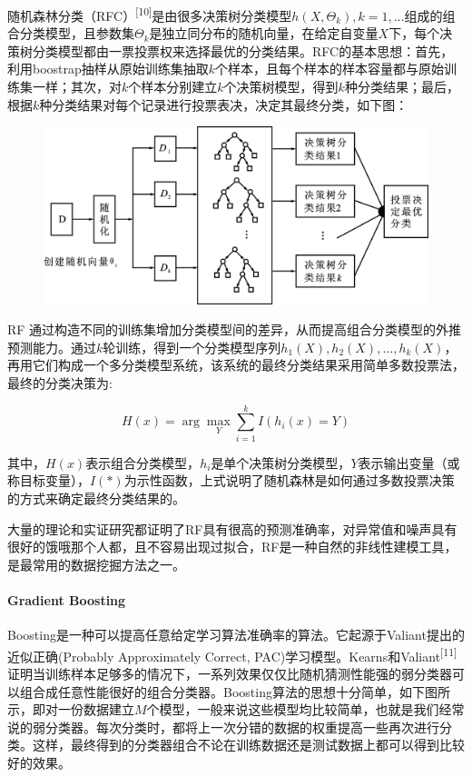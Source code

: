 随机森林分类（RFC）\textsuperscript{{[}10{]}}是由很多决策树分类模型\({h(X,\Theta_k),k=1,\ldots}\)组成的组合分类模型，且参数集\({\Theta_k}\)是独立同分布的随机向量，在给定自变量\(X\)下，每个决策树分类模型都由一票投票权来选择最优的分类结果。RFC的基本思想：首先，利用boostrap抽样从原始训练集抽取\(k\)个样本，且每个样本的样本容量都与原始训练集一样；其次，对\(k\)个样本分别建立\(k\)个决策树模型，得到\(k\)种分类结果；最后，根据\(k\)种分类结果对每个记录进行投票表决，决定其最终分类，如下图：

\begin{figure}[htbp]
\centering
\includegraphics{./images/rfc.jpg}
\caption{}
\end{figure}

RF
通过构造不同的训练集增加分类模型间的差异，从而提高组合分类模型的外推预测能力。通过\(k\)轮训练，得到一个分类模型序列\({h_1(X),h_2(X),\ldots,h_k(X)}\)，再用它们构成一个多分类模型系统，该系统的最终分类结果采用简单多数投票法，最终的分类决策为:

\[
H(x)=\arg\max_Y\sum_{i=1}^kI(h_i(x)=Y)
\]

其中，\(H(x)\)表示组合分类模型，\(h_i\)是单个决策树分类模型，\(Y\)表示输出变量（或称目标变量），\(I(*)\)为示性函数，上式说明了随机森林是如何通过多数投票决策的方式来确定最终分类结果的。

大量的理论和实证研究都证明了RF具有很高的预测准确率，对异常值和噪声具有很好的饿哦那个人都，且不容易出现过拟合，RF是一种自然的非线性建模工具，是最常用的数据挖掘方法之一。

\paragraph{Gradient Boosting}\label{gradient-boosting}

Boosting是一种可以提高任意给定学习算法准确率的算法。它起源于Valiant提出的近似正确(Probably
Approximately Correct,
PAC)学习模型。Kearns和Valiant\textsuperscript{{[}11{]}}证明当训练样本足够多的情况下，一系列效果仅仅比随机猜测性能强的弱分类器可以组合成任意性能很好的组合分类器。Boosting算法的思想十分简单，如下图所示，即对一份数据建立\(M\)个模型，一般来说这些模型均比较简单，也就是我们经常说的弱分类器。每次分类时，都将上一次分错的数据的权重提高一些再次进行分类。这样，最终得到的分类器组合不论在训练数据还是测试数据上都可以得到比较好的效果。

